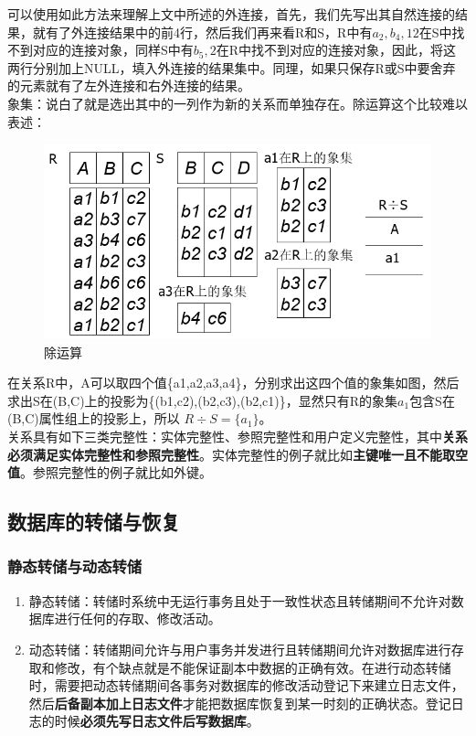 \documentclass[chapter.computer_science.tex]{subfiles}
\begin{document}
可以使用如此方法来理解上文中所述的外连接，首先，我们先写出其自然连接的结果，就有了外连接结果中的前4行，然后我们再来看R和S，R中有$ a_2,b_4,12 $在S中找不到对应的连接对象，同样S中有$ b_5,2 $在R中找不到对应的连接对象，因此，将这两行分别加上NULL，填入外连接的结果集中。同理，如果只保存R或S中要舍弃的元素就有了左外连接和右外连接的结果。\\
象集：说白了就是选出其中的一列作为新的关系而单独存在。除运算这个比较难以表述：\\
\begin{figure}[H]
    \centering
    \includegraphics[scale=0.25]{./images/0031.png}
    \caption{除运算}
\end{figure}
在关系R中，A可以取四个值\{a1,a2,a3,a4\}，分别求出这四个值的象集如图，然后求出S在(B,C)上的投影为\{(b1,c2),(b2,c3),(b2,c1)\}，显然只有R的象集$ a_1 $包含S在(B,C)属性组上的投影上，所以 $ R \div S=\{a_1\} $。\\
关系具有如下三类完整性：实体完整性、参照完整性和用户定义完整性，其中{\bfseries 关系必须满足实体完整性和参照完整性}。实体完整性的例子就比如{\bfseries 主键唯一且不能取空值}。参照完整性的例子就比如外键。

\subsection{数据库的转储与恢复}
\subsubsection{静态转储与动态转储}
\begin{enumerate}
    \item 静态转储：转储时系统中无运行事务且处于一致性状态且转储期间不允许对数据库进行任何的存取、修改活动。
    \item 动态转储：转储期间允许与用户事务并发进行且转储期间允许对数据库进行存取和修改，有个缺点就是不能保证副本中数据的正确有效。在进行动态转储时，需要把动态转储期间各事务对数据库的修改活动登记下来建立日志文件，然后{\bfseries 后备副本加上日志文件}才能把数据库恢复到某一时刻的正确状态。登记日志的时候{\bfseries 必须先写日志文件后写数据库}。
\end{enumerate}
\end{document}
